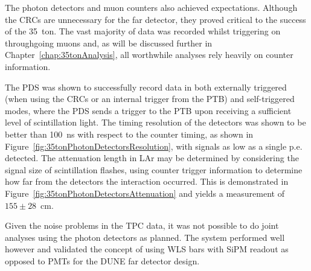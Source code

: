 The photon detectors and muon counters also achieved expectations.  Although the CRCs are unnecessary for the far detector, they proved critical to the success of the 35~ton.  The vast majority of data was recorded whilst triggering on throughgoing muons and, as will be discussed further in Chapter~\ref{chap:35tonAnalysis}, all worthwhile analyses rely heavily on counter information.

The PDS was shown to successfully record data in both externally triggered (when using the CRCs or an internal trigger from the PTB) and self-triggered modes, where the PDS sends a trigger to the PTB upon receiving a sufficient level of scintillation light.  The timing resolution of the detectors was shown to be better than 100~ns with respect to the counter timing, as shown in Figure~\ref{fig:35tonPhotonDetectorsResolution}, with signals as low as a single p.e. detected.  The attenuation length in LAr may be determined by considering the signal size of scintillation flashes, using counter trigger information to determine how far from the detectors the interaction occurred.  This is demonstrated in Figure~\ref{fig:35tonPhotonDetectorsAttenuation} and yields a measurement of $155\pm28$~cm.

Given the noise problems in the TPC data, it was not possible to do joint analyses using the photon detectors as planned.  The system performed well however and validated the concept of using WLS bars with SiPM readout as opposed to PMTs for the DUNE far detector design.

